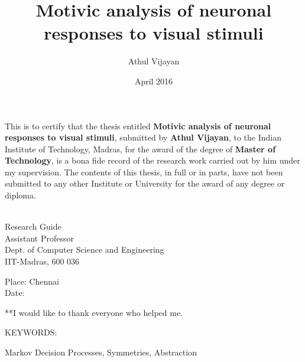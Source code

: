 \documentclass[MTech]{iitmdiss}
\def\thesistitle{Motivic analysis of neuronal responses to visual stimuli}
\def\thesisauthor{Athul Vijayan}
\begin{document}


\title{\thesistitle}

\author{\thesisauthor}

\date{April 2016}

\begin{singlespace}
\maketitle 
\end{singlespace} 



\certificate

\vspace*{0.5in}

\noindent This is to certify that the thesis entitled {\bf {\thesistitle}}, 
submitted by {\bf {\thesisauthor}}, to the Indian Institute of Technology, 
Madras, for the award of the degree of {\bf Master of Technology}, 
is a bona fide record of the research work carried out by him under my
supervision. The contents of this thesis, in full or in parts, have not been
submitted to any other Institute or University for the award of any degree or
diploma.

\vspace*{1.4in}
\hspace*{-0.25in}
\begin{singlespace}
 \\
\noindent Research Guide \\ 
\noindent Assistant Professor \\
\noindent Dept. of Computer Science and Engineering\\
\noindent IIT-Madras, 600 036 \\
\end{singlespace}
\vspace*{0.20in}
\noindent Place: Chennai\\ 
Date:

\acknowledgements

**I would like to thank everyone who helped me.

\abstract
\noindent KEYWORDS: \hspace*{0.5em} \parbox[t]{4.4in}{Markov Decision Processes,
Symmetries, Abstraction}
\vspace*{24pt}
\end{document}
